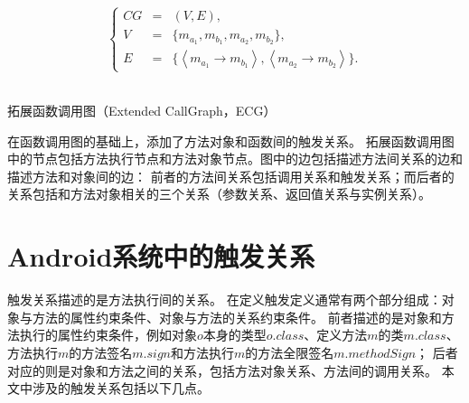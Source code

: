 \begin{equation}  
\left\{  
\begin{array}{lll}
CG &= &(V,E) ,\\ 
  V &= & \{m_{a_{1}},m_{b_{1}},m_{a_{2}},m_{b_{2}}\}, \\ 
  E &= & \{  
\left\langle  m_{a_{1}} \to m_{b_{1}} \right\rangle  ,\left\langle  m_{a_{2}} \to m_{b_{2}}\right\rangle 
\}. 
\end{array}  
\right.  
\label{equ:dcg_sample} 
\end{equation} 




\begin{Def}
	拓展函数调用图（Extended CallGraph，ECG）
\end{Def}


	在函数调用图的基础上，添加了方法对象和函数间的触发关系。
	拓展函数调用图中的节点包括方法执行节点和方法对象节点。图中的边包括描述方法间关系的边和描述方法和对象间的边：
	前者的方法间关系包括调用关系和触发关系；而后者的关系包括和方法对象相关的三个关系（参数关系、返回值关系与实例关系）。
	
	
	
\section{Android系统中的触发关系}

触发关系描述的是方法执行间的关系。
在定义触发定义通常有两个部分组成：对象与方法的属性约束条件、对象与方法的关系约束条件。
前者描述的是对象和方法执行的属性约束条件，例如对象$o$本身的类型$o.class$、定义方法$m$的类$m.class$、方法执行$m$的方法签名$m.sign$和方法执行$m$的方法全限签名$m.methodSign$；
后者对应的则是对象和方法之间的关系，包括方法对象关系、方法间的调用关系。
本文中涉及的触发关系包括以下几点。




